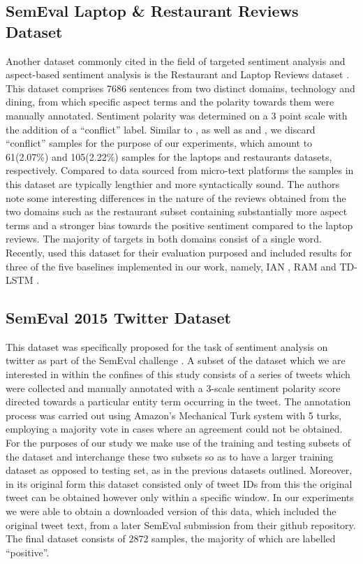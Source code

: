 \documentclass[../../fyp.tex]{subfiles}
\begin{document}
\subsection{SemEval Laptop \& Restaurant Reviews Dataset} \label{ds:pontiki}
Another dataset commonly cited in the field of targeted sentiment analysis and aspect-based sentiment analysis is the Restaurant and Laptop Reviews dataset \cite{pontiki}. This dataset comprises 7686 sentences from two distinct domains, technology and dining, from which specific aspect terms and the polarity towards them were manually annotated. Sentiment polarity was determined on a 3 point scale with the addition of a \enquote{conflict} label. Similar to \citet{dehongma2017}, as well as \citet{chen2017} and \citet{tang2016b}, we discard \enquote{conflict} samples for the purpose of our experiments, which amount to 61(2.07\%) and 105(2.22\%) samples for the laptops and restaurants datasets, respectively. Compared to data sourced from micro-text platforms the samples in this dataset are typically lengthier and more syntactically sound. The authors note some interesting differences in the nature of the reviews obtained from the two domains such as the restaurant subset containing substantially more aspect terms and a stronger bias towards the positive sentiment compared to the laptop reviews. The majority of targets in both domains consist of a single word. Recently, \citet{xue2018} used this dataset for their evaluation purposed and included results for three of the five baselines implemented in our work, namely, IAN \cite{dehongma2017}, RAM \cite{chen2017} and TD-LSTM \cite{tang2016b}.

\subsection{SemEval 2015 Twitter Dataset} \label{ds:resenthal}
This dataset was specifically proposed for the task of sentiment analysis on twitter as part of the SemEval challenge \cite{rosenthal2015}. A subset of the dataset which we are interested in within the confines of this study consists of a series of tweets which were collected and manually annotated with a 3-scale sentiment polarity score directed towards a particular entity term occurring in the tweet. The annotation process was carried out using Amazon's Mechanical Turk system with 5 turks, employing a majority vote in cases where an agreement could not be obtained. For the purposes of our study we make use of the training and testing subsets of the dataset and interchange these two subsets so as to have a larger training dataset as opposed to testing set, as in the previous datasets outlined. Moreover, in its original form this dataset consisted only of tweet IDs  from this the original tweet can be obtained however only within a specific window. In our experiments we were able to obtain a  downloaded version of this data, which included the original tweet text, from a later SemEval submission \cite{baziotis2017} from their github repository. The final dataset consists of 2872 samples, the majority of which are labelled \enquote{positive}.
\end{document}
